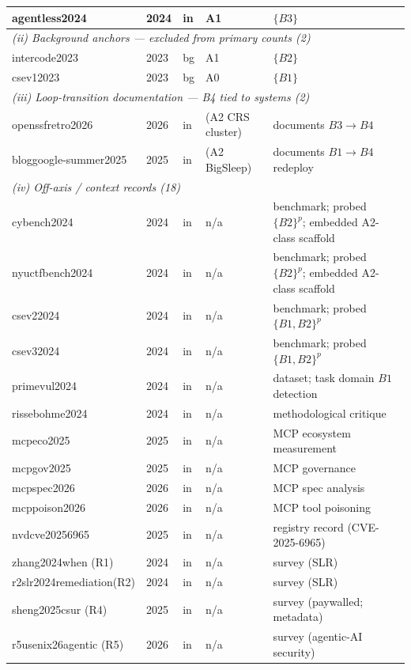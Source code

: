 \begin{table}[t]
{\begin{tabular}{lllll}
agentless2024            & 2024 & in & A1        & $\{B3\}$ \\
\hline
\multicolumn{5}{l}{\emph{(ii) Background anchors --- excluded from primary counts (2)}}\\
intercode2023            & 2023 & bg & A1        & $\{B2\}$ \\
csev12023                & 2023 & bg & A0        & $\{B1\}$ \\
\hline
\multicolumn{5}{l}{\emph{(iii) Loop-transition documentation --- B4 tied to systems (2)}}\\
openssfretro2026         & 2026 & in & (A2 CRS cluster) & documents $B3{\to}B4$ \\
bloggoogle-summer2025    & 2025 & in & (A2 BigSleep)    & documents $B1{\to}B4$ redeploy \\
\hline
\multicolumn{5}{l}{\emph{(iv) Off-axis / context records (18)}}\\
cybench2024              & 2024 & in & n/a & benchmark; probed $\{B2\}^p$; embedded A2-class scaffold \\
nyuctfbench2024          & 2024 & in & n/a & benchmark; probed $\{B2\}^p$; embedded A2-class scaffold \\
csev22024                & 2024 & in & n/a & benchmark; probed $\{B1,B2\}^p$ \\
csev32024                & 2024 & in & n/a & benchmark; probed $\{B1,B2\}^p$ \\
primevul2024             & 2024 & in & n/a & dataset; task domain $B1$ detection \\
rissebohme2024           & 2024 & in & n/a & methodological critique \\
mcpeco2025               & 2025 & in & n/a & MCP ecosystem measurement \\
mcpgov2025               & 2025 & in & n/a & MCP governance \\
mcpspec2026              & 2026 & in & n/a & MCP spec analysis \\
mcppoison2026            & 2026 & in & n/a & MCP tool poisoning \\
nvdcve20256965           & 2025 & in & n/a & registry record (CVE-2025-6965) \\
zhang2024when (R1)       & 2024 & in & n/a & survey (SLR) \\
r2slr2024remediation(R2) & 2024 & in & n/a & survey (SLR) \\
sheng2025csur (R4)       & 2025 & in & n/a & survey (paywalled; metadata) \\
r5usenix26agentic (R5)   & 2026 & in & n/a & survey (agentic-AI security) \\

\end{tabular}}
\end{table}
